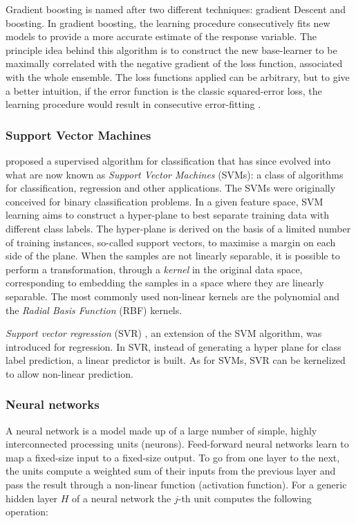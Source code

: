 Gradient boosting is named after two different techniques: gradient Descent and boosting. In gradient boosting, the learning procedure consecutively fits new models to provide a more accurate estimate of the response variable. The principle idea behind this algorithm is to construct the new base-learner to be maximally correlated with the negative gradient of the loss function, associated with the whole ensemble. The loss functions applied can be arbitrary, but to give a better intuition, if the error function is the classic squared-error loss, the learning procedure would result in consecutive error-fitting \citep{natekin2013gradient}. 

\subsubsection{Support Vector Machines} \label{Support Vector Machines}

\citet{boser1992training} proposed a supervised algorithm for classification that has since evolved into what are now known as \textit{Support Vector Machines} (SVMs): a class of algorithms for classification, regression and other applications.
The SVMs were originally conceived for binary classification problems. In a given feature space, SVM learning aims to construct a hyper-plane to best separate training data with different class labels. The hyper-plane is derived on the basis of a limited number of training instances, so-called support vectors, to maximise a margin on each side of the plane. When the samples are not linearly separable, it is possible to perform a transformation, through a \textit{kernel} in the original data space, corresponding to embedding the samples in a space where they are linearly separable. The most commonly used non-linear kernels are the polynomial and the \textit{Radial Basis Function} (RBF) kernels.

\textit{Support vector regression} (SVR) \citep{drucker1997support}, an extension of the SVM algorithm, was introduced for regression. In SVR, instead of generating a hyper plane for class label prediction, a linear predictor is built. As for SVMs, SVR can be kernelized to allow non-linear prediction.

\subsubsection{Neural networks} \label{Neural network}

A neural network is a model made up of a large number of simple, highly interconnected processing units (neurons). Feed-forward neural networks learn to map a fixed-size input to a fixed-size output. To go from one layer to the next, the units compute a weighted sum of their inputs from the previous layer and pass the result through a non-linear function (activation function). For a generic hidden layer $H$ of a neural network the $j$-th unit computes the following operation:  

